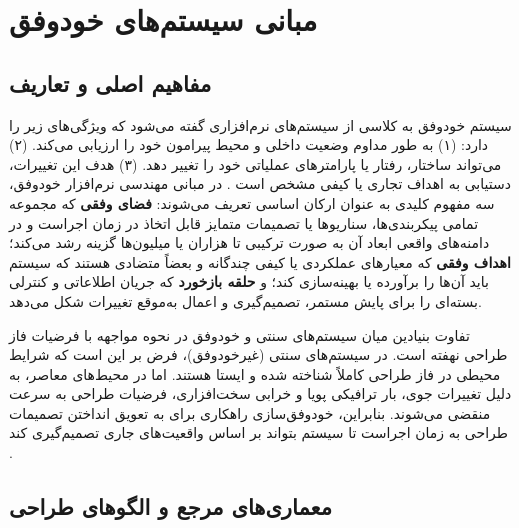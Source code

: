 \documentclass[oneside,openany,phd]{TMU-Thesis}
\begin{document}
\section{مبانی سیستم‌های خودوفق}

\subsection{مفاهیم اصلی و تعاریف}

سیستم خودوفق به کلاسی از سیستم‌های نرم‌افزاری گفته می‌شود که ویژگی‌های زیر را دارد: (۱) به طور مداوم وضعیت داخلی و محیط پیرامون خود را ارزیابی می‌کند. (۲) می‌تواند ساختار، رفتار یا پارامترهای عملیاتی خود را تغییر دهد. (۳) هدف این تغییرات، دستیابی به اهداف تجاری یا کیفی مشخص است \cite{kephart2003vision}. در مبانی مهندسی نرم‌افزار خودوفق، سه مفهوم کلیدی به عنوان ارکان اساسی تعریف می‌شوند: \textbf{فضای وفقی} که مجموعه تمامی پیکربندی‌ها، سناریوها یا تصمیمات متمایز قابل اتخاذ در زمان اجراست و در دامنه‌های واقعی ابعاد آن به صورت ترکیبی تا هزاران یا میلیون‌ها گزینه رشد می‌کند؛ \textbf{اهداف وفقی} که معیارهای عملکردی یا کیفی چندگانه و بعضاً متضادی هستند که سیستم باید آن‌ها را برآورده یا بهینه‌سازی کند؛ و \textbf{حلقه بازخورد} که جریان اطلاعاتی و کنترلی بسته‌ای را برای پایش مستمر، تصمیم‌گیری و اعمال به‌موقع تغییرات شکل می‌دهد.

تفاوت بنیادین میان سیستم‌های سنتی و خودوفق در نحوه مواجهه با فرضیات فاز طراحی نهفته است. در سیستم‌های سنتی (غیرخودوفق)، فرض بر این است که شرایط محیطی در فاز طراحی کاملاً شناخته شده و ایستا هستند. اما در محیط‌های معاصر، به دلیل تغییرات جوی، بار ترافیکی پویا و خرابی سخت‌افزاری، فرضیات طراحی به سرعت منقضی می‌شوند. بنابراین، خودوفق‌سازی راهکاری برای به تعویق انداختن تصمیمات طراحی به زمان اجراست تا سیستم بتواند بر اساس واقعیت‌های جاری تصمیم‌گیری کند \cite{oreizy1999architecture}.

\subsection{معماری‌های مرجع و الگوهای طراحی}
\end{document}
